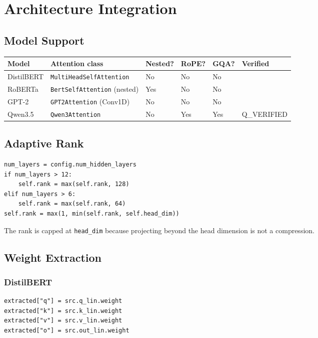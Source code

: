 
\section{Architecture Integration}

\subsection{Model Support}

\begin{table}[H]
\centering
\small
\begin{tabular}{llllll}
\toprule
\textbf{Model} & \textbf{Attention class} & \textbf{Nested?} & \textbf{RoPE?} & \textbf{GQA?} & \textbf{Verified} \\
\midrule
DistilBERT & \texttt{MultiHeadSelfAttention} & No & No & No &  \\
RoBERTa & \texttt{BertSelfAttention} (nested) & Yes & No & No &  \\
GPT-2 & \texttt{GPT2Attention} (Conv1D) & No & No & No &  \\
Qwen3.5 & \texttt{Qwen3Attention} & No & Yes & Yes & {{Q\_VERIFIED}} \\
\bottomrule
\end{tabular}
\end{table}

\subsection{Adaptive Rank}

\begin{lstlisting}
num_layers = config.num_hidden_layers
if num_layers > 12:
    self.rank = max(self.rank, 128)
elif num_layers > 6:
    self.rank = max(self.rank, 64)
self.rank = max(1, min(self.rank, self.head_dim))
\end{lstlisting}

The rank is capped at \texttt{head\_dim} because projecting beyond the head 
dimension is not a compression.

\subsection{Weight Extraction}

\subsubsection{DistilBERT}

\begin{lstlisting}
extracted["q"] = src.q_lin.weight
extracted["k"] = src.k_lin.weight
extracted["v"] = src.v_lin.weight
extracted["o"] = src.out_lin.weight
\end{lstlisting}

